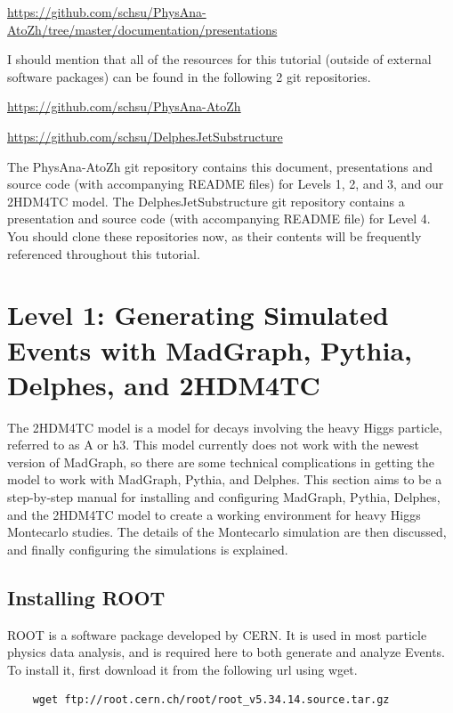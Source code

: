 \documentclass{article}
\begin{document}
\bigskip

\url{https://github.com/schsu/PhysAna-AtoZh/tree/master/documentation/presentations}

\bigskip

I should mention that all of the resources for this tutorial (outside of external software packages) can be found in
the following 2 git repositories.

\bigskip

\url{https://github.com/schsu/PhysAna-AtoZh}

\url{https://github.com/schsu/DelphesJetSubstructure}

\bigskip

The PhysAna-AtoZh git repository contains this document, presentations and source code
(with accompanying README files) for Levels 1, 2, and 3, and our 2HDM4TC model.
The DelphesJetSubstructure git repository contains a presentation and source code
(with accompanying README file) for Level 4. You should clone these repositories now,
as their contents will be frequently referenced throughout this tutorial.

\section{Level 1: Generating Simulated Events with MadGraph, Pythia, Delphes, and 2HDM4TC}

The 2HDM4TC model is a model for decays involving the heavy Higgs particle, referred to as A or h3.
This model currently does not work with the newest version of MadGraph, so there are some technical
complications in getting the model to work with MadGraph, Pythia, and Delphes. This section aims to
be a step-by-step manual for installing and configuring MadGraph, Pythia, Delphes, and the 2HDM4TC
model to create a working environment for heavy Higgs Montecarlo studies. The details of the Montecarlo
simulation are then discussed, and finally configuring the simulations is explained.

\subsection{Installing ROOT}

ROOT is a software package developed by CERN. It is used in most particle physics data analysis,
and is required here to both generate and analyze Events. To install it, first download it from
the following url using wget.

\begin{verbatim}
	wget ftp://root.cern.ch/root/root_v5.34.14.source.tar.gz
\end{verbatim}
\end{document}
